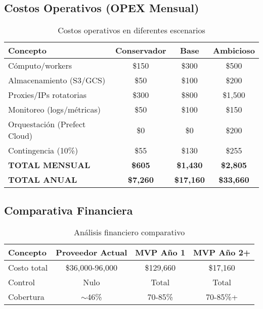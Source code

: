 \documentclass[12pt,a4paper]{article}
\begin{document}
\subsection{Costos Operativos (OPEX Mensual)}

\begin{table}[h]
\centering
\begin{tabularx}{\textwidth}{|X|c|c|c|}
\hline
\textbf{Concepto} & \textbf{Conservador} & \textbf{Base} & \textbf{Ambicioso} \\
\hline
Cómputo/workers & \$150 & \$300 & \$500 \\
\hline
Almacenamiento (S3/GCS) & \$50 & \$100 & \$200 \\
\hline
Proxies/IPs rotatorias & \$300 & \$800 & \$1,500 \\
\hline
Monitoreo (logs/métricas) & \$50 & \$100 & \$150 \\
\hline
Orquestación (Prefect Cloud) & \$0 & \$0 & \$200 \\
\hline
Contingencia (10\%) & \$55 & \$130 & \$255 \\
\hline
\textbf{TOTAL MENSUAL} & \textbf{\$605} & \textbf{\$1,430} & \textbf{\$2,805} \\
\hline
\textbf{TOTAL ANUAL} & \textbf{\$7,260} & \textbf{\$17,160} & \textbf{\$33,660} \\
\hline
\end{tabularx}
\caption{Costos operativos en diferentes escenarios}
\end{table}

\subsection{Comparativa Financiera}

\begin{table}[h]
\centering
\begin{tabularx}{\textwidth}{|X|c|c|c|}
\hline
\textbf{Concepto} & \textbf{Proveedor Actual} & \textbf{MVP Año 1} & \textbf{MVP Año 2+} \\
\hline
Costo total & \$36,000-96,000 & \$129,660 & \$17,160 \\
\hline
Control & \textcolor{dangerred}{Nulo} & \textcolor{successgreen}{Total} & \textcolor{successgreen}{Total} \\
\hline
Cobertura & $\sim$46\% & 70-85\% & 70-85\%+ \\
\hline
\end{tabularx}
\caption{Análisis financiero comparativo}
\end{table}
\end{document}
